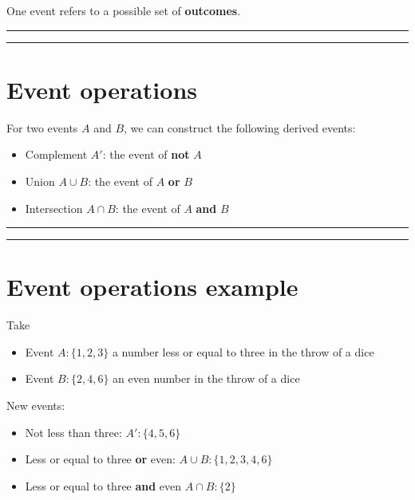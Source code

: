 \documentclass[
]{book}
\providecommand{\tightlist}{%
  \setlength{\itemsep}{0pt}\setlength{\parskip}{0pt}}
\begin{document}
One event refers to a possible set of \textbf{outcomes}.

\begin{center}\rule{0.5\linewidth}{0.5pt}\end{center}

\begin{center}\rule{0.5\linewidth}{0.5pt}\end{center}

\hypertarget{event-operations}{%
\section{Event operations}\label{event-operations}}

For two events \(A\) and \(B\), we can construct the following derived events:

\begin{itemize}
\tightlist
\item
  Complement \(A'\): the event of \textbf{not} \(A\)
\item
  Union \(A \cup B\): the event of \(A\) \textbf{or} \(B\)\\
\item
  Intersection \(A \cap B\): the event of \(A\) \textbf{and} \(B\)
\end{itemize}

\begin{center}\rule{0.5\linewidth}{0.5pt}\end{center}

\begin{center}\rule{0.5\linewidth}{0.5pt}\end{center}

\hypertarget{event-operations-example}{%
\section{Event operations example}\label{event-operations-example}}

Take

\begin{itemize}
\tightlist
\item
  Event \(A:\{1,2,3\}\) a number less or equal to three in the throw of a dice\\
\item
  Event \(B:\{2,4,6\}\) an even number in the throw of a dice
\end{itemize}

New events:

\begin{itemize}
\tightlist
\item
  Not less than three: \(A':\{4,5,6\}\)
\item
  Less or equal to three \textbf{or} even: \(A \cup B: \{1,2,3,4,6\}\)
\item
  Less or equal to three \textbf{and} even \(A \cap B: \{2\}\)
\end{itemize}
\end{document}
